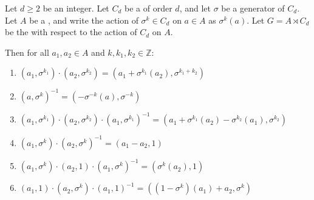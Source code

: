 \begin{lemma} \label{lemma:semidirect_product_of_abelian_group_with_cyclic_group_has_explicit_operations}
    Let $d \geq 2$ be an integer. Let $C_d$ be a  of order $d$, and let $\sigma$ be a generator of $C_d$. Let $A$ be a , and write the action of $\sigma^k \in C_d$ on $a \in A$ as $\sigma^k(a)$. Let $G = A \rtimes C_d$ be the  with respect to the action of $C_d$ on $A$.

    Then for all $a_1, a_2 \in A$ and $k, k_1, k_2 \in \mathbb{Z}$:
    \begin{enumerate}
        \item \label{item:semidirect_product_group_law_Cd} $(a_1, \sigma^{k_1}) \cdot (a_2, \sigma^{k_2}) = (a_1 + \sigma^{k_1}(a_2), \sigma^{k_1+k_2})$
        \item \label{item:semidirect_product_inverse_Cd} $(a, \sigma^k)^{-1} = (-\sigma^{-k}(a), \sigma^{-k})$
        \item \label{item:semidirect_product_conjugation_general_Cd} $(a_1, \sigma^{k_1}) \cdot (a_2, \sigma^{k_2}) \cdot (a_1, \sigma^{k_1})^{-1} = (a_1 + \sigma^{k_1}(a_2) - \sigma^{k_2}(a_1), \sigma^{k_2})$
        \item \label{item:semidirect_product_same_rotation_difference_Cd} $(a_1, \sigma^k) \cdot (a_2, \sigma^k)^{-1} = (a_1 - a_2, 1)$
        \item \label{item:semidirect_product_conjugation_pure_translation_Cd} $(a_1, \sigma^k) \cdot (a_2, 1) \cdot (a_1, \sigma^k)^{-1} = (\sigma^k(a_2), 1)$
        \item \label{item:semidirect_product_conjugation_pure_rotation_Cd} $(a_1, 1) \cdot (a_2, \sigma^k) \cdot (a_1, 1)^{-1} = ((1 - \sigma^k)(a_1) + a_2, \sigma^k)$
    \end{enumerate}
\end{lemma}

